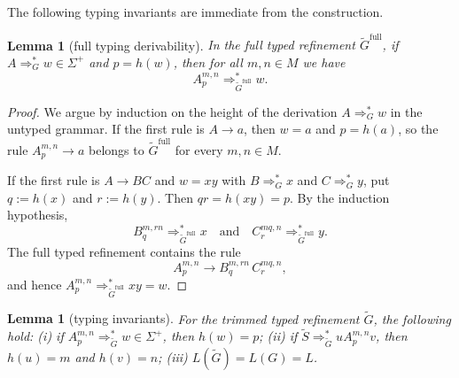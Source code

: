 \documentclass[11pt,a4paper]{article}
\newtheorem{lemma}[theorem]{Lemma}
\begin{document}
The following typing invariants are immediate from the construction.

\begin{lemma}[full typing derivability]
\label{lem:typed-full}
In the full typed refinement $\widetilde G^{\mathrm{full}}$, if
$A\Rightarrow_G^* w\in\Sigma^+$ and $p=h(w)$, then for all
$m,n\in M$ we have
\[
  A_p^{m,n}\Rightarrow_{\widetilde G^{\mathrm{full}}}^* w .
\]
\end{lemma}

\begin{proof}
We argue by induction on the height of the derivation
$A\Rightarrow_G^* w$ in the untyped grammar. If the first rule is
$A\to a$, then $w=a$ and $p=h(a)$, so the rule
$A_p^{m,n}\to a$ belongs to $\widetilde G^{\mathrm{full}}$ for every
$m,n\in M$.

If the first rule is $A\to BC$ and $w=xy$ with
$B\Rightarrow_G^* x$ and $C\Rightarrow_G^* y$, put
$q:=h(x)$ and $r:=h(y)$. Then $qr=h(xy)=p$. By the induction hypothesis,
\[
  B_q^{m,rn}\Rightarrow_{\widetilde G^{\mathrm{full}}}^* x
  \quad\text{and}\quad
  C_r^{mq,n}\Rightarrow_{\widetilde G^{\mathrm{full}}}^* y .
\]
The full typed refinement contains the rule
\[
  A_p^{m,n}\to B_q^{m,rn}\,C_r^{mq,n},
\]
and hence $A_p^{m,n}\Rightarrow_{\widetilde G^{\mathrm{full}}}^*xy=w$.
\end{proof}

\begin{lemma}[typing invariants]
\label{lem:typed}
For the trimmed typed refinement $\widetilde G$, the following hold:
\textup{(i)} if $A_p^{m,n}\Rightarrow_{\widetilde G}^* w\in\Sigma^+$,
then $h(w)=p$;
\textup{(ii)} if $\widetilde S\Rightarrow_{\widetilde G}^* uA_p^{m,n}v$,
then $h(u)=m$ and $h(v)=n$;
\textup{(iii)} $L(\widetilde G)=L(G)=L$.
\end{lemma}
\end{document}
